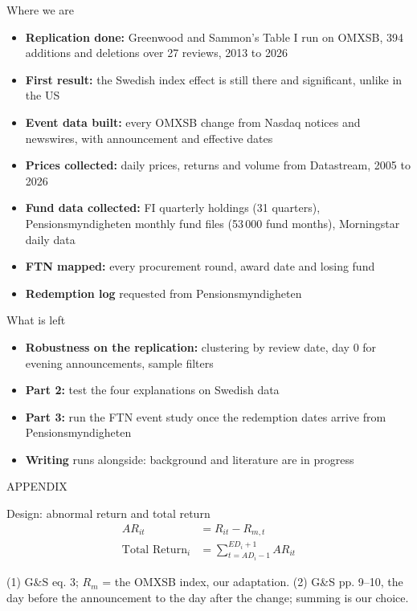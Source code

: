 \documentclass[aspectratio=169]{beamer}
\begin{document}
\begin{frame}[label=progress]{Where we are}
  \begin{itemize}
    \item \textbf{Replication done:} Greenwood and Sammon's Table I run on OMXSB,
      394 additions and deletions over 27 reviews, 2013 to 2026
    \item \textbf{First result:} the Swedish index effect is still there and
      significant, unlike in the US
    \item \textbf{Event data built:} every OMXSB change from Nasdaq notices and
      newswires, with announcement and effective dates
    \item \textbf{Prices collected:} daily prices, returns and volume from
      Datastream, 2005 to 2026
    \item \textbf{Fund data collected:} FI quarterly holdings (31 quarters),
      Pensionsmyndigheten monthly fund files (53\,000 fund months), Morningstar daily data
    \item \textbf{FTN mapped:} every procurement round, award date and losing fund
    \item \textbf{Redemption log} requested from Pensionsmyndigheten
  \end{itemize}
\end{frame}

\begin{frame}[label=remaining]{What is left}
  \begin{itemize}
    \item \textbf{Robustness on the replication:} clustering by review date, day 0
      for evening announcements, sample filters
    \item \textbf{Part 2:} test the four explanations on Swedish data
    \item \textbf{Part 3:} run the FTN event study once the redemption dates arrive
      from Pensionsmyndigheten
    \item \textbf{Writing} runs alongside: background and literature are in progress
  \end{itemize}
\end{frame}

\appendix
{}  %
\begin{frame}[plain]
  \centering\LARGE APPENDIX
\end{frame}

\begin{frame}{Design: abnormal return and total return}
  \begin{align}
    AR_{it} &= R_{it} - R_{m,t} \\
    \text{Total Return}_i &= \sum_{t=AD_i-1}^{ED_i+1} AR_{it}
  \end{align}
  {\scriptsize (1) G\&S eq. 3; $R_m$ = the OMXSB index, our adaptation.
  (2) G\&S pp. 9--10, the day before the announcement to the day after the change; summing is our choice.\par}
\end{frame}
\end{document}

